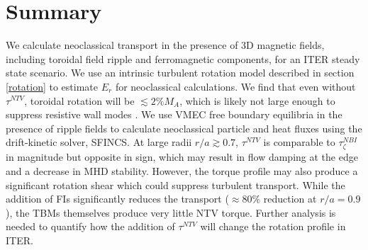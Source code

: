 \documentclass{article}
\begin{document}
\FloatBarrier

\section{Summary}\label{summary}

We calculate neoclassical transport in the presence of 3D magnetic fields, including toroidal field ripple and ferromagnetic components, for an ITER steady state scenario. We use an intrinsic turbulent rotation model described in section \ref{rotation} to estimate $E_r$ for neoclassical calculations. We find that even without $\tau^{NTV}$, toroidal rotation will be $\lesssim 2\% M_A$, which is likely not large enough to suppress resistive wall modes \cite{Liu2004}. We use VMEC free boundary equilibria in the presence of ripple fields to calculate neoclassical particle and heat fluxes using the drift-kinetic solver, SFINCS. At large radii $r/a \gtrsim 0.7$, $\tau^{NTV}$ is comparable to $\tau^{NBI}_{\zeta}$ in magnitude but opposite in sign, which may result in flow damping at the edge and a decrease in MHD stability. However, the torque profile may also produce a significant rotation shear which could suppress turbulent transport. While the addition of FIs significantly reduces the transport ($\approx 80\%$ reduction at $r/a = 0.9$), the TBMs themselves produce very little NTV torque. Further analysis is needed to quantify how the addition of $\tau^{NTV}$ will change the rotation profile in ITER. 
\end{document}
